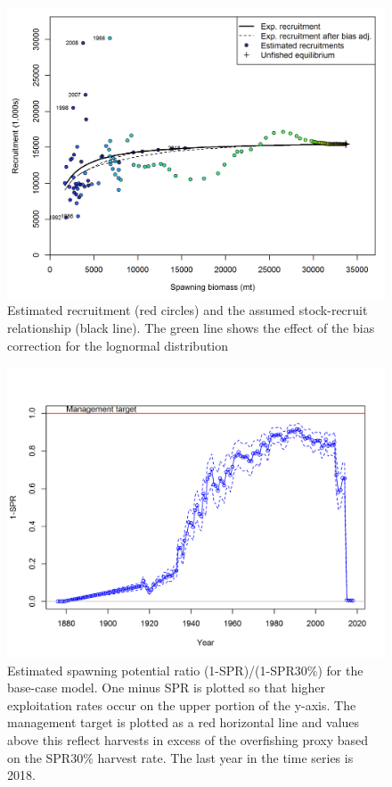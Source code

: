 \documentclass[12pt,]{article}
\begin{document}
\FloatBarrier

\begin{figure}
\centering
\includegraphics{r4ss/plots_mod1/SR_curve2.png}
\caption{Estimated recruitment (red circles) and the assumed
stock-recruit relationship (black line). The green line shows the effect
of the bias correction for the lognormal distribution
\label{fig:stock_recruit_curve}}
\end{figure}

\begin{figure}
\centering
\includegraphics{r4ss/plots_mod1/SPR3_ratiointerval.png}
\caption{Estimated spawning potential ratio (1-SPR)/(1-SPR30\%) for the
base-case model. One minus SPR is plotted so that higher exploitation
rates occur on the upper portion of the y-axis. The management target is
plotted as a red horizontal line and values above this reflect harvests
in excess of the overfishing proxy based on the SPR30\% harvest rate.
The last year in the time series is 2018. \label{fig:SPR}}
\end{figure}
\end{document}
